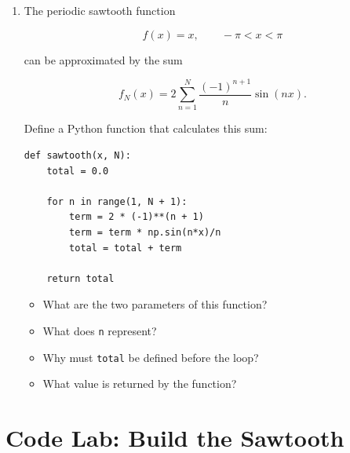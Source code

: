 \documentclass{article}
\begin{document}
\begin{enumerate}

\item The periodic sawtooth function

\[
f(x)=x,\qquad -\pi < x < \pi
\]

can be approximated by the sum

\[
f_N(x)=
2\sum_{n=1}^{N}
\frac{(-1)^{n+1}}{n}\sin(nx).
\]

Define a Python function that calculates this sum:

\begin{verbatim}
def sawtooth(x, N):
    total = 0.0

    for n in range(1, N + 1):
        term = 2 * (-1)**(n + 1)
        term = term * np.sin(n*x)/n
        total = total + term

    return total
\end{verbatim}

\begin{itemize}

\item What are the two parameters of this function?

\item What does \texttt{n} represent?

\item Why must \texttt{total} be defined before the loop?

\item What value is returned by the function?

\end{itemize}

\end{enumerate}


\section{Code Lab: Build the Sawtooth}
\end{document}
